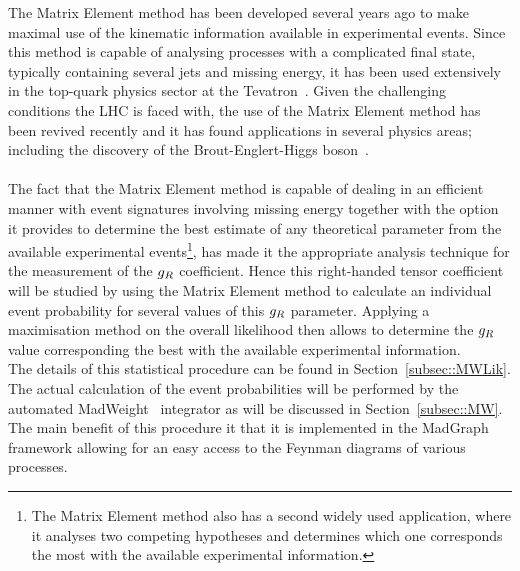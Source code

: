 The Matrix Element method has been developed several years ago to make maximal use of the kinematic information available in experimental events.
Since this method is capable of analysing processes with a complicated final state, typically containing several jets and missing energy, it has been used extensively in the top-quark physics sector at the Tevatron~\cite{MEMCDF, MEMCDF2, MEMD0}.
Given the challenging conditions the LHC is faced with, the use of the Matrix Element method has been revived recently and it has found applications in several physics areas; including the discovery of the Brout-Englert-Higgs boson~\cite{CMSHiggsMEM, CMSttHMEM}.
\\
\\
The fact that the Matrix Element method is capable of dealing in an efficient manner with event signatures involving missing energy together with the option it provides to determine the best estimate of any theoretical parameter from the available experimental events\footnote{The Matrix Element method also has a second widely used application, where it analyses two competing hypotheses and determines which one corresponds the most with the available experimental information.}, has made it the appropriate analysis technique for the measurement of the $g_{R}$ coefficient.
Hence this right-handed tensor coefficient will be studied by using the Matrix Element method to calculate an individual event probability for several values of this $g_{R}$ parameter. 
Applying a maximisation method on the overall likelihood then allows to determine the $g_{R}$ value corresponding the best with the available experimental information. %
%
\\
The details of this statistical procedure can be found in Section~\ref{subsec::MWLik}.
The actual calculation of the event probabilities will be performed by the automated MadWeight~\cite{MadWeightPaper} integrator as will be discussed in Section~\ref{subsec::MW}. The main benefit of this procedure it that it is implemented in the MadGraph framework allowing for an easy access to the Feynman diagrams of various processes.

